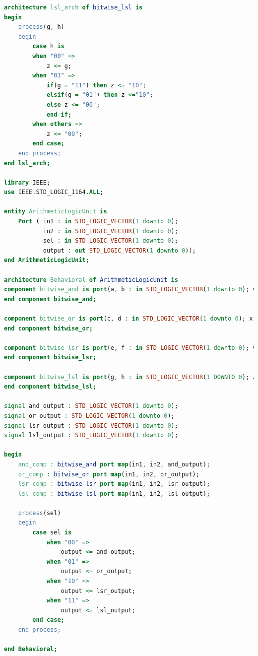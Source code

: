 \documentclass[11pt]{article}
\begin{document}
\begin{appendices}
\begin{lstlisting}[language=VHDL]
architecture lsl_arch of bitwise_lsl is
begin
    process(g, h)
    begin
        case h is
        when "00" =>
            z <= g;
        when "01" =>
            if(g = "11") then z <= "10";
            elsif(g = "01") then z <="10";
            else z <= "00";
            end if;
        when others =>
            z <= "00";
        end case;
    end process;
end lsl_arch;

library IEEE;
use IEEE.STD_LOGIC_1164.ALL;

entity ArithmeticLogicUnit is
    Port ( in1 : in STD_LOGIC_VECTOR(1 downto 0);
           in2 : in STD_LOGIC_VECTOR(1 downto 0);
           sel : in STD_LOGIC_VECTOR(1 downto 0);
           output : out STD_LOGIC_VECTOR(1 downto 0));
end ArithmeticLogicUnit;

architecture Behavioral of ArithmeticLogicUnit is
component bitwise_and is port(a, b : in STD_LOGIC_VECTOR(1 downto 0); v : out STD_LOGIC_VECTOR(1 downto 0));
end component bitwise_and;

component bitwise_or is port(c, d : in STD_LOGIC_VECTOR(1 downto 0); x : out STD_LOGIC_VECTOR(1 downto 0));
end component bitwise_or;

component bitwise_lsr is port(e, f : in STD_LOGIC_VECTOR(1 downto 0); y : out STD_LOGIC_VECTOR(1 downto 0));
end component bitwise_lsr;

component bitwise_lsl is port(g, h : in STD_LOGIC_VECTOR(1 DOWNTO 0); z : out STD_LOGIC_VECTOR(1 downto 0));
end component bitwise_lsl;

signal and_output : STD_LOGIC_VECTOR(1 downto 0);
signal or_output : STD_LOGIC_VECTOR(1 downto 0);
signal lsr_output : STD_LOGIC_VECTOR(1 downto 0);
signal lsl_output : STD_LOGIC_VECTOR(1 downto 0);

begin
    and_comp : bitwise_and port map(in1, in2, and_output);
    or_comp : bitwise_or port map(in1, in2, or_output);
    lsr_comp : bitwise_lsr port map(in1, in2, lsr_output);
    lsl_comp : bitwise_lsl port map(in1, in2, lsl_output);
    
    process(sel)
    begin
        case sel is
            when "00" =>
                output <= and_output;
            when "01" =>
                output <= or_output;
            when "10" =>
                output <= lsr_output;
            when "11" =>
                output <= lsl_output;
        end case;
    end process;                

end Behavioral;
\end{lstlisting}


\end{appendices}
\end{document}
